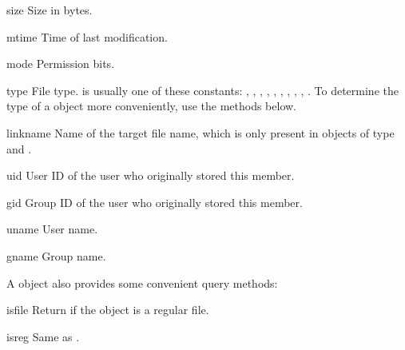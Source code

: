 \begin{memberdesc}{size}
    Size in bytes.
\end{memberdesc}

\begin{memberdesc}{mtime}
    Time of last modification.
\end{memberdesc}

\begin{memberdesc}{mode}
    Permission bits.
\end{memberdesc}

\begin{memberdesc}{type}
    File type.   is usually one of these constants:
    , , ,
    , , ,
    , , ,
    .  To determine the type of a
     object more conveniently, use the 
    methods below.
\end{memberdesc}

\begin{memberdesc}{linkname}
    Name of the target file name, which is only present in
     objects of type  and
    .
\end{memberdesc}

\begin{memberdesc}{uid}
    User ID of the user who originally stored this member.
\end{memberdesc}

\begin{memberdesc}{gid}
    Group ID of the user who originally stored this member.
\end{memberdesc}

\begin{memberdesc}{uname}
    User name.
\end{memberdesc}

\begin{memberdesc}{gname}
    Group name.
\end{memberdesc}

A  object also provides some convenient query methods:

\begin{methoddesc}{isfile}{}
    Return  if the  object is a regular
    file.
\end{methoddesc}

\begin{methoddesc}{isreg}{}
    Same as .
\end{methoddesc}

